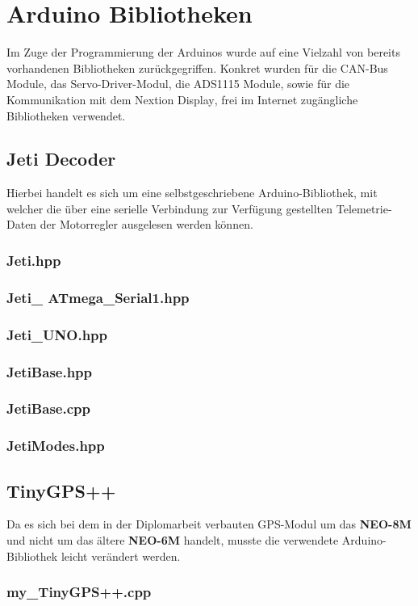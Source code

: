 \section{Arduino Bibliotheken}
Im Zuge der Programmierung der Arduinos wurde auf eine Vielzahl von bereits vorhandenen Bibliotheken zurückgegriffen. Konkret wurden für die CAN-Bus Module\textsuperscript{\cite{ArduinoBibliothekCANBus}}, 
das Servo-Driver-Modul\textsuperscript{\cite{ArduinoBibliothekServoPWM}}, 
die ADS1115 Module\textsuperscript{\cite{ArduinoBibliothekADS1115}}, 
sowie für die Kommunikation mit dem Nextion Display\textsuperscript{\cite{ArduinoBibliothekNextion}}, frei im Internet zugängliche Bibliotheken verwendet.
\subsection{Jeti Decoder}
Hierbei handelt es sich um eine selbstgeschriebene Arduino-Bibliothek, mit welcher die über eine serielle Verbindung zur Verfügung gestellten Telemetrie-Daten der Motorregler ausgelesen werden können.
\subsubsection{Jeti.hpp}

\subsubsection{Jeti\_ ATmega\_Serial1.hpp}

\subsubsection{Jeti\_UNO.hpp}

\subsubsection{JetiBase.hpp}

\subsubsection{JetiBase.cpp}


\subsubsection{JetiModes.hpp}

\clearpage
\subsection{TinyGPS++}
Da es sich bei dem in der Diplomarbeit verbauten GPS-Modul um das \textbf{NEO-8M} 
und nicht um das ältere \textbf{NEO-6M} handelt, musste die verwendete Arduino-Bibliothek\textsuperscript{\cite{ArduinoBibliothekGPS}} leicht verändert werden.
\subsubsection{my\_TinyGPS++.cpp}

